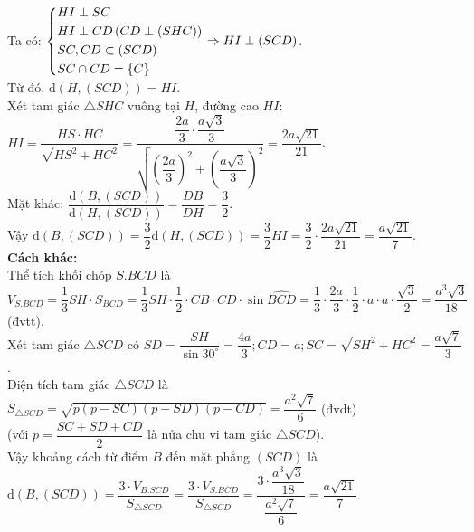 \begin{ex}
{{
		}
		Ta có: $\left\{\begin{aligned}&HI\perp SC\\&HI\perp CD\left(CD\perp(SHC)\right)\\&SC,CD\subset(SCD)\\&SC\cap CD=\{C\}\end{aligned}\right.\Rightarrow HI\perp(SCD)$.\\
		Từ đó, $\mathrm{d}\left(H,(SCD)\right)=HI$.\\
		Xét tam giác $\triangle SHC$ vuông tại $H$, đường cao $HI$:\\
		$HI=\dfrac{HS\cdot HC}{\sqrt{HS^2+HC^2}}=\dfrac{\dfrac{2a}{3}\cdot\dfrac{a\sqrt{3}}{3}}{\sqrt{\left(\dfrac{2a}{3}\right)^2+\left(\dfrac{a\sqrt{3}}{3}\right)^2}}=\dfrac{2a\sqrt{21}}{21}$.\\
		Mặt khác: $\dfrac{\mathrm{d}\left(B,(SCD)\right)}{\mathrm{d}\left(H,(SCD)\right)}=\dfrac{DB}{DH}=\dfrac{3}{2}$.\\
		Vậy
		$\mathrm{d}\left(B,(SCD)\right)=\dfrac{3}{2}\mathrm{d}\left(H,(SCD)\right)=\dfrac{3}{2}HI=\dfrac{3}{2}\cdot\dfrac{2a\sqrt{21}}{21}=\dfrac{a\sqrt{21}}{7}$.\\
		\textbf{Cách khác:}\\
		Thể tích khối chóp $S.BCD$ là\\
		$V_{S.BCD}=\dfrac{1}{3}SH\cdot S_{BCD}=\dfrac{1}{3}SH\cdot\dfrac{1}{2}\cdot CB\cdot CD\cdot\sin\widehat{BCD}=\dfrac{1}{3}\cdot\dfrac{2a}{3}\cdot\dfrac{1}{2}\cdot a\cdot a\cdot\dfrac{\sqrt{3}}{2}=\dfrac{a^3\sqrt{3}}{18}$ (đvtt).\\
		Xét tam giác $\triangle SCD$ có $SD=\dfrac{SH}{\sin 30^{\circ}}=\dfrac{4a}{3}; CD=a; SC=\sqrt{SH^2+HC^2}=\dfrac{a\sqrt{7}}{3}$.\\
		Diện tích tam giác $\triangle SCD$ là $S_{\triangle SCD}=\sqrt{p(p-SC)(p-SD)(p-CD)}=\dfrac{a^2\sqrt{7}}{6}$ (đvdt)\\
		(với $p=\dfrac{SC+SD+CD}{2}$ là nửa chu vi tam giác $\triangle SCD$).\\
		Vậy khoảng cách từ điểm $B$ đến mặt phẳng $(SCD)$ là\\
		$\mathrm{d}\left(B,(SCD)\right)=\dfrac{3\cdot V_{B.SCD}}{S_{\triangle SCD}}=\dfrac{3\cdot V_{S.BCD}}{S_{\triangle SCD}}=\dfrac{3\cdot\dfrac{a^3\sqrt{3}}{18}}{\dfrac{a^2\sqrt{7}}{6}}=\dfrac{a\sqrt{21}}{7}$.
	}
\end{ex}
